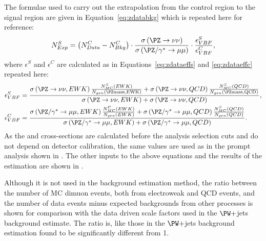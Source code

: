 The formulae used to carry out the extrapolation from the control region to the signal region are given in Equation~\ref{eq:zdatabkg} which is repeated here for reference:
\begin{equation}
  \label{eq:zdatabkgrep}
  N^{S}_{Exp}=\left(N^{C}_{Data}-N^{C}_{Bkg}\right)\cdot\frac{\sigma\left(\PZ\rightarrow\nu\nu\right)}{\sigma\left(\PZ/\gamma^{*}\rightarrow\mu\mu\right)}\cdot\frac{\epsilon^{S}_{VBF}}{\epsilon^{C}_{VBF}},
\end{equation}
where $\epsilon^{S}$ and $\epsilon^{C}$ are calculated as in Equations~\ref{eq:zdataeffs} and \ref{eq:zdataeffc} repeated here:
\begin{align}
  \label{eq:zdataeffsrep}
  \epsilon^{S}_{VBF}&=\frac{ \sigma\left(\PZ\rightarrow\nu\nu,EWK\right) \frac{N^{S}_{MC}\left(EWK\right)} {N_{gen}\left(\PZ \rm{mass},EWK\right)} + \sigma\left(\PZ\rightarrow\nu\nu,QCD\right) \frac{N^{S}_{MC}\left(QCD\right)} {N_{gen}\left(\PZ \rm{mass},QCD\right)} } {\sigma\left(\PZ\rightarrow\nu\nu,EWK\right) + \sigma\left(\PZ\rightarrow\nu\nu,QCD\right)},\\
  \label{eq:zdataeffcrep}
  \epsilon^{C}_{VBF}&=\frac{  \sigma\left(\PZ/\gamma^{*}\rightarrow\mu\mu,EWK\right) \frac{N^{C}_{MC}\left(EWK\right)} {N_{gen}\left(EWK\right)} + \sigma\left(\PZ/\gamma^{*}\rightarrow\mu\mu,QCD\right) \frac{N^{S}_{MC}\left(QCD\right)} {N_{gen}\left(QCD\right)}  }{\sigma\left(\PZ/\gamma^{*}\rightarrow\mu\mu,EWK\right)+\sigma\left(\PZ/\gamma^{*}\rightarrow\mu\mu,QCD\right)}.
\end{align}
As the \Zmumu and \Znunu cross-sections are calculated before the analysis selection cuts and do not depend on detector calibration, the same values are used as in the prompt analysis shown in . The other inputs to the above equations and the results of the estimation are shown in .

Although it is not used in the \Znunu background estimation method, the ratio between the number of \ac{MC} dimuon events, both from electroweak and \ac{QCD} events, and the number of data events minus expected backgrounds from other processes is shown for comparison with the data driven scale factors used in the $\PW+$jets background estimate. The ratio is, like those in the $\PW+$jets background estimation found to be significantly different from 1. 

